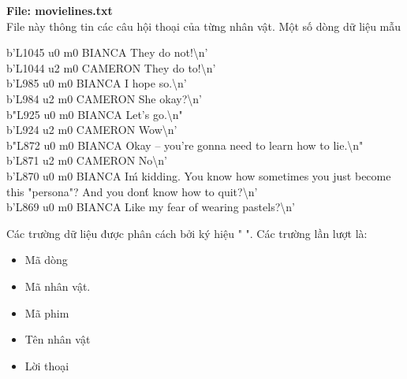 \textbf{File: movie\detokenize{_}lines.txt} \\
File này thông tin các câu hội thoại của từng nhân vật. Một số dòng dữ liệu mẫu
\begin{displayquote}
b'L1045 \detokenize{+++\$+++} u0 \detokenize{+++\$+++} m0 \detokenize{+++\$+++} BIANCA \detokenize{+++\$+++} They do not!\textbackslash{}n' \\
b'L1044 \detokenize{+++\$+++}  u2 \detokenize{+++\$+++}  m0 \detokenize{+++\$+++}  CAMERON \detokenize{+++\$+++}  They do to!\textbackslash{}n' \\
b'L985 \detokenize{+++\$+++}  u0 \detokenize{+++\$+++}  m0 \detokenize{+++\$+++}  BIANCA \detokenize{+++\$+++}  I hope so.\textbackslash{}n' \\
b'L984 \detokenize{+++\$+++}  u2 \detokenize{+++\$+++}  m0 \detokenize{+++\$+++}  CAMERON \detokenize{+++\$+++}  She okay?\textbackslash{}n' \\
b"L925 \detokenize{+++\$+++}  u0 \detokenize{+++\$+++}  m0 \detokenize{+++\$+++}  BIANCA \detokenize{+++\$+++}  Let's go.\textbackslash{}n" \\
b'L924 \detokenize{+++\$+++}  u2 \detokenize{+++\$+++}  m0 \detokenize{+++\$+++}  CAMERON \detokenize{+++\$+++}  Wow\textbackslash{}n' \\
b"L872 \detokenize{+++\$+++}  u0 \detokenize{+++\$+++}  m0 \detokenize{+++\$+++}  BIANCA \detokenize{+++\$+++}  Okay -- you're gonna need to learn how to lie.\textbackslash{}n" \\
b'L871 \detokenize{+++\$+++}  u2 \detokenize{+++\$+++}  m0 \detokenize{+++\$+++}  CAMERON \detokenize{+++\$+++}  No\textbackslash{}n' \\
b'L870 \detokenize{+++\$+++}  u0 \detokenize{+++\$+++}  m0 \detokenize{+++\$+++}  BIANCA \detokenize{+++\$+++}  I\'m kidding.  You know how sometimes you just become this
"persona"?  And you don\'t know how to quit?\textbackslash{}n' \\
b'L869 \detokenize{+++\$+++}  u0 \detokenize{+++\$+++}  m0 \detokenize{+++\$+++}  BIANCA \detokenize{+++\$+++}  Like my fear of wearing pastels?\textbackslash{}n' \\
\end{displayquote}
Các trường dữ liệu được phân cách bởi ký hiệu "\detokenize{+++\$+++} ".
Các trường lần lượt là:
\begin{itemize}
    \item Mã dòng
    \item Mã nhân vật.
    \item Mã phim
    \item Tên nhân vật
    \item Lời thoại
\end{itemize}

